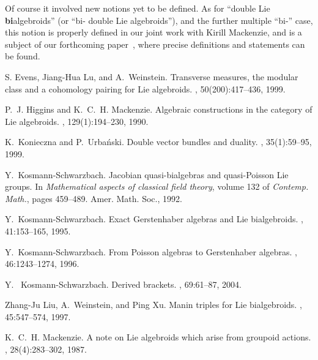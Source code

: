 \documentclass[12pt,reqno,a4paper]{amsart}
\theoremstyle{definition}
\begin{document}
Of course it involved new notions yet to be defined.   As for ``double Lie \textbf{bi}algebroids''
(or ``bi- double Lie algebroids''), and the further multiple ``bi-''
case, this  notion is  properly defined in our joint work with
Kirill Mackenzie, and is a subject of our forthcoming
paper~\cite{mackenzie:bidouble}, where precise definitions and
statements can be found.

\begin{thebibliography}{10}

S. Evens, Jiang-Hua Lu, and A.~Weinstein.
\newblock Transverse measures, the modular class and a cohomology pairing for
  {L}ie algebroids.
, 50(200):417--436, 1999.

P.~J. Higgins and K.~C.~H. Mackenzie.
\newblock Algebraic constructions in the category of {L}ie algebroids.
, 129(1):194--230, 1990.

K.~Konieczna and P.~Urba{\'n}ski.
\newblock Double vector bundles and duality.
, 35(1):59--95, 1999.

Y.~Kosmann-Schwarzbach.
\newblock Jacobian quasi-bialgebras and quasi-{Poisson} {Lie} groups.
\newblock In {\em Mathematical aspects of classical field theory}, volume 132
  of {\em Contemp. Math.}, pages 459--489. Amer. Math. Soc., 1992.

Y.~Kosmann-Schwarzbach.
\newblock Exact {Gerstenhaber} algebras and {Lie} bialgebroids.
, 41:153--165, 1995.

Y.~Kosmann-Schwarzbach.
\newblock From {Poisson} algebras to {Gerstenhaber} algebras.
, 46:1243--1274, 1996.

Y.~ Kosmann-Schwarzbach.
\newblock Derived brackets.
, 69:61--87, 2004.

Zhang-Ju Liu, A.~Weinstein, and Ping Xu.
\newblock Manin triples for {Lie} bialgebroids.
, 45:547--574, 1997.

{K.~C.~H. Mackenzie.}
\newblock A note on {L}ie algebroids which arise from groupoid actions.
,
  28(4):283--302, 1987.


\end{thebibliography}
\end{document}
